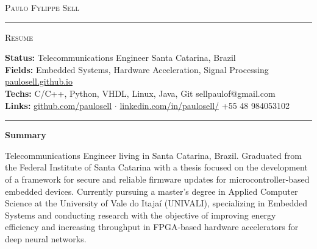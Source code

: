 \documentclass[10pt,A4]{article}
\newcommand{\sectionspace}{
	\vspace{0.1cm}
}
\newcommand{\cvsection}[1]
{
	\begin{center}
		\large\textcolor{sectcol}{\textbf{#1}}
	\end{center}
	\sectionspace
}
\newcommand{\metasection}[2]
{
\footnotesize{#2} \hspace*{\fill} \footnotesize{#1}\\[1pt]
}
\begin{document}
\pagestyle{fancy}	








\vspace{-8pt}
\begin{center}
	\HUGE \textsc{Paulo Fylippe Sell} \textcolor{sectcol}{\rule[-1mm]{1mm}{0.9cm}} \textsc{Resume}\\[2pt]
	
\end{center}



\vspace{6pt}


\metasection{Santa Catarina, Brazil}{\textbf{Status:} Telecommunications Engineer}
\metasection{\href{https://paulosell.github.io}{paulosell.github.io}}{\textbf{Fields:} Embedded Systems, Hardware Acceleration, Signal Processing}
\metasection{sellpaulof@gmail.com}{\textbf{Techs:} C/C++, Python, VHDL, Linux, Java, Git}
\metasection{+55 48 984053102}{\textbf{Links:} \href{https://github.com/paulosell}{github.com/paulosell} $\cdot$ \href{https://www.linkedin.com/in/paulosell/}{linkedin.com/in/paulosell/}} 
\vspace{-2pt}
\textcolor{softcol}{\hrule}
\vspace{6pt}

\normalsize

\vspace{-6pt}
\cvsection{Summary}
Telecommunications Engineer living in Santa Catarina, Brazil. Graduated from the Federal Institute of Santa Catarina with a thesis focused on the development of a framework for secure and reliable firmware updates for microcontroller-based embedded devices. Currently pursuing a master's degree in Applied Computer Science at the University of Vale do Itajaí (UNIVALI), specializing in Embedded Systems and conducting research with the objective of improving energy efficiency and increasing throughput in FPGA-based hardware accelerators for deep neural networks.\\
\end{document}
